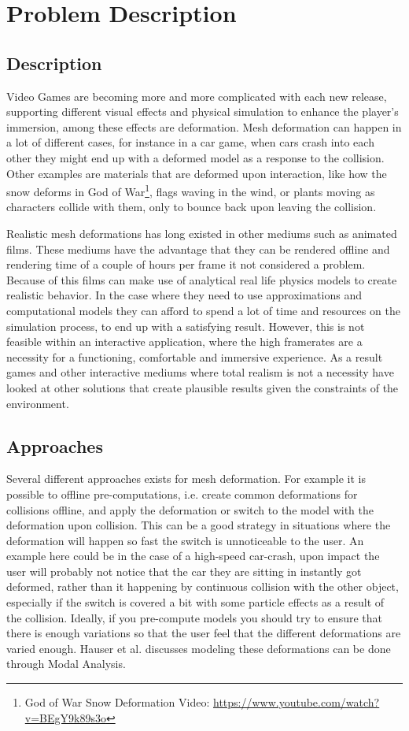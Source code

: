 \chapter{Problem Description}
\section{Description}
Video Games are becoming more and more complicated with each new release, supporting different visual effects and physical simulation
to enhance the player's immersion, among these effects are deformation. 
Mesh deformation can happen in a lot of different cases, for instance in a car game, when cars crash into each other they might
end up with a deformed model as a response to the collision. 
Other examples are materials that are deformed upon interaction, like how the snow deforms in God of War\footnote{God of War Snow Deformation Video: \url{https://www.youtube.com/watch?v=BEgY9k89s3o}}, flags waving in the wind, or plants moving as characters collide with them, only to bounce back upon leaving the collision.

Realistic mesh deformations has long existed in other mediums such as animated films.
These mediums have the advantage that they can be rendered offline and rendering time of a couple of hours per frame
it not considered a problem. Because of this films can make use of analytical real life physics models to create realistic behavior.
In the case where they need to use approximations and computational models they can afford to spend a lot of time and resources on
the simulation process, to end up with a satisfying result.
However, this is not feasible within an interactive application, where the high framerates are a necessity for a functioning,
comfortable and immersive experience. As a result games and other interactive mediums where total realism is not a necessity
have looked at other solutions that create plausible results given the constraints of the environment.

\section{Approaches}
Several different approaches exists for mesh deformation.
For example it is possible to offline pre-computations, i.e. create common deformations for collisions offline, and apply the deformation or switch to the model with the deformation upon collision. 
This can be a good strategy in situations where the deformation will happen so fast the switch is unnoticeable to the user.
An example here could be in the case of a high-speed car-crash, upon impact the user will probably not notice that the car they are sitting in instantly got deformed,
rather than it happening by continuous collision with the other object, especially if the switch is covered a bit with some particle effects as a result of the collision.
Ideally, if you pre-compute models you should try to ensure that there is enough variations so that the user feel that the different deformations are varied enough.
Hauser et al.\cite{hauser2003interactive} discusses modeling these deformations can be done through Modal Analysis.

